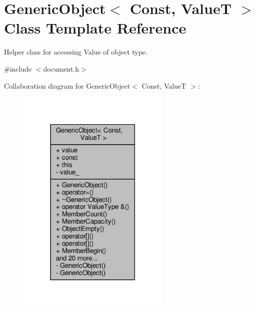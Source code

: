 \hypertarget{classGenericObject}{}\section{Generic\+Object$<$ Const, ValueT $>$ Class Template Reference}
\label{classGenericObject}


Helper class for accessing Value of object type.  




{\ttfamily \#include $<$document.\+h$>$}



Collaboration diagram for Generic\+Object$<$ Const, ValueT $>$\+:
\nopagebreak
\begin{figure}[H]
\begin{center}
\leavevmode
\includegraphics[width=206pt]{classGenericObject__coll__graph}
\end{center}
\end{figure}
